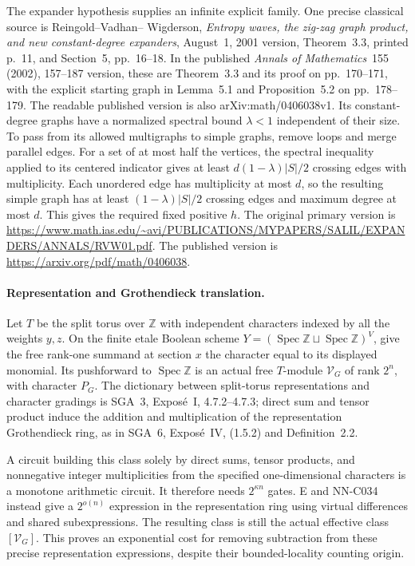 The expander hypothesis supplies an infinite explicit
family. One precise classical source is Reingold--Vadhan--
Wigderson, \emph{Entropy waves, the zig-zag graph product,
and new constant-degree expanders}, August~1, 2001 version,
Theorem~3.3, printed p.~11, and Section~5, pp.~16--18. In the published \emph{Annals of Mathematics}~155 (2002), 157--187 version, these are Theorem~3.3 and its proof on pp.~170--171, with the explicit starting graph in Lemma~5.1 and Proposition~5.2 on pp.~178--179. The readable published version is also arXiv:math/0406038v1. Its constant-degree
graphs have a normalized spectral bound $\lambda<1$
independent of their size. To pass from its allowed
multigraphs to simple graphs, remove loops and merge
parallel edges. For a set of at most half the vertices,
the spectral inequality applied to its centered indicator
gives at least $d(1-\lambda)|S|/2$ crossing edges with
multiplicity. Each unordered edge has multiplicity at
most $d$, so the resulting simple graph has at least
$(1-\lambda)|S|/2$ crossing edges and maximum degree
at most $d$. This gives the required fixed positive $h$.
The original primary version is
\url{https://www.math.ias.edu/~avi/PUBLICATIONS/MYPAPERS/SALIL/EXPANDERS/ANNALS/RVW01.pdf}. The published version is
\url{https://arxiv.org/pdf/math/0406038}.

\paragraph{Representation and Grothendieck translation.}
Let $T$ be the split torus over $\mathbb Z$ with independent
characters indexed by all the weights $y,z$. On the finite
etale Boolean scheme
$Y=(\operatorname{Spec}\mathbb Z\sqcup\operatorname{Spec}\mathbb Z)^V$,
give the free rank-one summand at section $x$ the character
equal to its displayed monomial. Its pushforward to
$\operatorname{Spec}\mathbb Z$ is an actual free $T$-module
$\mathcal V_G$ of rank $2^n$, with character $P_G$.
The dictionary between split-torus representations and
character gradings is SGA~3, Expos\'e~I,
4.7.2--4.7.3; direct sum and tensor product induce the
addition and multiplication of the representation
Grothendieck ring, as in SGA~6, Expos\'e~IV,
(1.5.2) and Definition~2.2.

A circuit building this class solely by direct sums,
tensor products, and nonnegative integer multiplicities
from the specified one-dimensional characters is a
monotone arithmetic circuit. It therefore needs
$2^{\kappa n}$ gates. E and NN-C034 instead give a
$2^{o(n)}$ expression in the representation ring using
virtual differences and shared subexpressions. The
resulting class is still the actual effective class
$[\mathcal V_G]$. This proves an exponential cost for
removing subtraction from these precise representation
expressions, despite their bounded-locality counting origin.


